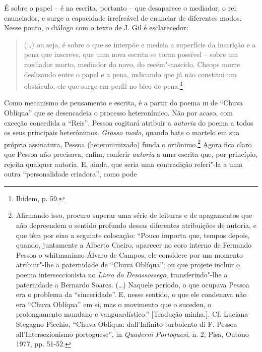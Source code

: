 É sobre o papel -- é na escrita, portanto -- que desaparece o mediador,
o rei enunciador, e surge a capacidade irrefreável de enunciar de
diferentes modos. Nesse ponto, o diálogo com o texto de J. Gil é
esclarecedor:

\begin{quote}
(\ldots{}) ou seja, é sobre o que se interpõe e medeia a superfície da
inscrição e a pena que inscreve, que uma nova escrita se torna possível
-- sobre um mediador morto, mediador do novo, do recém"-nascido. Cheops
morre deslizando entre o papel e a pena, indicando que já não constitui
um obstáculo, ele que surge em perfil no bico de pena.\footnote{Ibidem,
  p. 59.}
\end{quote}

Como mecanismo de pensamento e escrita, é a partir do poema \textsc{iii}
de ``Chuva Oblíqua'' que se desencadeia o processo heteronímico. Não por
acaso, com exceção concedida a ``Reis'', Pessoa cogitará atribuir a
\emph{autoria} do poema a todos os seus principais heterônimos.
\emph{Grosso modo}, quando bate o martelo em sua própria assinatura,
Pessoa (heteronimizado) funda o ortônimo.\footnote{Afirmando isso,
  procuro superar uma série de leituras e de apagamentos que não
  depreendem o sentido profundo dessas diferentes atribuições de
  autoria, e que têm por eixo a seguinte colocação: ``Pouco importa que,
  tempos depois, quando, juntamente a Alberto Caeiro, aparecer no coro
  interno de Fernando Pessoa o whitmaniano Álvaro de Campos, ele
  considere por um momento atribuir"-lhe a paternidade de ``Chuva
  Oblíqua''; ou que projete incluir o poema interseccionista no
  \emph{Livro do Desassossego}, transferindo"-lhe a paternidade a
  Bernardo Soares. (\ldots{}) Naquele período, o que ocupava Pessoa era o
  problema da ``sinceridade''. E, nesse sentido, o que ele condenava não
  era ``Chuva Oblíqua'' em si, mas o movimento que o sucedeu, o
  prolongamento mundano e vanguardístico.'' {[}Tradução minha.{]}. Cf.
  Luciana Stegagno Picchio, ``Chuva Oblíqua: dall'Infinito turbolento di
  F. Pessoa all'Intersezionismo portoguese'', in \emph{Quaderni
  Portoguesi}, n. 2, Pisa, Outono 1977, pp. 51-52.} Agora fica claro que
Pessoa não precisava, enfim, conferir \emph{autoria} a uma escrita que,
por princípio, rejeita qualquer autoria. E, ainda, que seria uma
contradição referi"-la a uma outra ``personalidade criadora'', como pode
